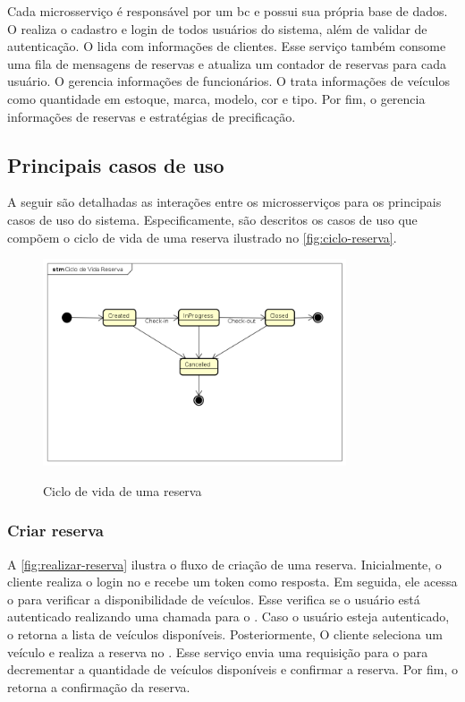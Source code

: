 Cada microsserviço é responsável por um \acrshort{bc} e possui sua própria base de dados. O  realiza o cadastro e login de todos usuários do sistema, além de validar  de autenticação. O  lida com informações de clientes. Esse serviço também consome uma fila de mensagens de reservas e atualiza um contador de reservas para cada usuário. O  gerencia informações de funcionários. O  trata informações de veículos como quantidade em estoque, marca, modelo, cor e tipo. Por fim, o  gerencia informações de reservas e estratégias de precificação.

\subsection{Principais casos de uso}
A seguir são detalhadas as interações entre os microsserviços para os principais casos de uso do sistema. Especificamente, são descritos os casos de uso que compõem o ciclo de vida de uma reserva ilustrado no \autoref{fig:ciclo-reserva}.

\begin{figure}[H]
    \centering
    \caption{Ciclo de vida de uma reserva}
    \includegraphics[width=0.8\textwidth]{media/ciclo-reserva.png}
    \label{fig:ciclo-reserva}
\end{figure}

\subsubsection{Criar reserva}
A \autoref{fig:realizar-reserva} ilustra o fluxo de criação de uma reserva. Inicialmente, o cliente realiza o login no  e recebe um token como resposta. Em seguida, ele acessa o  para verificar a disponibilidade de veículos. Esse verifica se o usuário está autenticado realizando uma chamada para o . Caso o usuário esteja autenticado, o  retorna a lista de veículos disponíveis. Posteriormente, O cliente seleciona um veículo e realiza a reserva no . Esse serviço envia uma requisição para o  para decrementar a quantidade de veículos disponíveis e confirmar a reserva. Por fim, o  retorna a confirmação da reserva.

